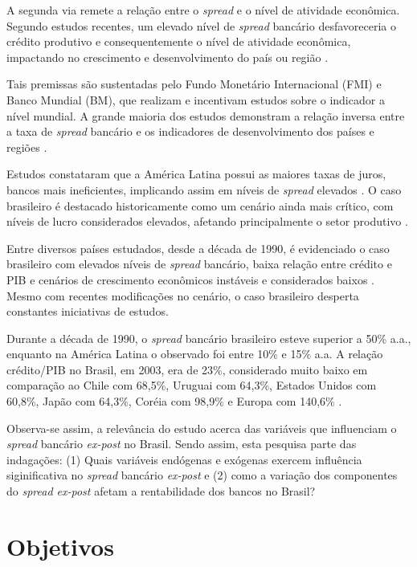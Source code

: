 \documentclass[12pt,12pt,openright,oneside,a4paper,chapter=TITLE,section=TITLE,subsection=TITLE,subsubsection=TITLE,english,french,spanish,portugues,sumario=tradicional]{abntex2}
\begin{document}
A segunda via remete a relação entre o \emph{spread} e o nível de atividade
econômica. Segundo estudos recentes, um elevado nível de \emph{spread} bancário
desfavoreceria o crédito produtivo e consequentemente o nível de atividade
econômica, impactando no crescimento e desenvolvimento do país ou região \cite{WB:2005} \cite{dantas:2012} \cite{leal:2006}.

Tais premissas são sustentadas pelo Fundo Monetário Internacional (FMI) e Banco Mundial (BM), que realizam e incentivam estudos sobre o indicador a nível mundial. A grande maioria dos estudos demonstram a relação inversa entre a taxa de \emph{spread} bancário e os indicadores de desenvolvimento dos países e regiões \cite{WB:2005}.

Estudos constataram que a América Latina possui as maiores taxas de juros, bancos mais ineficientes, implicando assim em níveis de \emph{spread} elevados \cite{dantas:2012}. O caso brasileiro é destacado historicamente como um cenário ainda mais crítico, com níveis de lucro considerados elevados, afetando principalmente o setor produtivo \cite{dantas:2012}.

Entre diversos países estudados, desde a década de 1990, é evidenciado o caso brasileiro com elevados níveis de \emph{spread} bancário, baixa relação entre crédito e PIB e cenários de crescimento econômicos instáveis e considerados baixos \cite{levine:1997, matos:2003}. Mesmo com recentes modificações no cenário, o caso brasileiro desperta constantes iniciativas de estudos.

Durante a década de 1990, o \emph{spread} bancário brasileiro esteve superior a 50\% a.a., enquanto na América Latina o observado foi entre 10\% e 15\% a.a. A relação crédito/PIB no Brasil, em 2003, era de 23\%, considerado muito baixo em comparação ao Chile com 68,5\%, Uruguai com 64,3\%, Estados Unidos com 60,8\%, Japão com 64,3\%, Coréia com 98,9\% e Europa com 140,6\% \cite{camargo:2009, singh:2005}.

Observa-se assim, a relevância do estudo acerca das variáveis que influenciam o \emph{spread} bancário \emph{ex-post} no Brasil. Sendo assim, esta pesquisa parte das indagações: (1) Quais variáveis endógenas e exógenas exercem influência siginificativa no \emph{spread} bancário \emph{ex-post} e (2) como a variação dos componentes do \emph{spread ex-post} afetam a rentabilidade dos bancos no Brasil?

\section{Objetivos}
\end{document}
